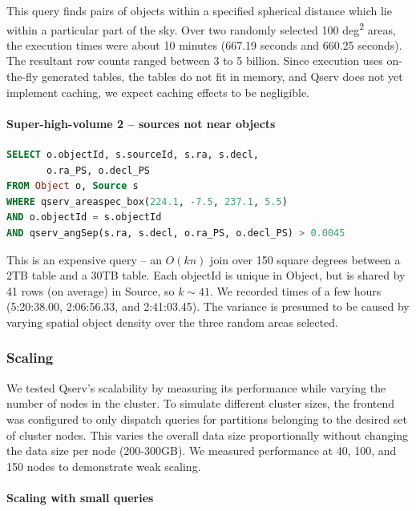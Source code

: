 \documentclass[DM,lsstdraft,toc]{lsstdoc}
\begin{document}
This query finds pairs of objects within a specified spherical distance
which lie within a particular part of the sky. Over two randomly
selected 100 deg\textsuperscript{2} areas, the execution times were
about 10 minutes (667.19 seconds and 660.25 seconds). The resultant row
counts ranged between 3 to 5 billion. Since execution uses on-the-fly
generated tables, the tables do not fit in memory, and Qserv does not
yet implement caching, we expect caching effects to be negligible.

\paragraph{Super-high-volume 2 -- sources not near
objects}\label{super-high-volume-2-sources-not-near-objects}

\begin{lstlisting}[language=SQL]
SELECT o.objectId, s.sourceId, s.ra, s.decl,
       o.ra_PS, o.decl_PS
FROM Object o, Source s
WHERE qserv_areaspec_box(224.1, -7.5, 237.1, 5.5)
AND o.objectId = s.objectId
AND qserv_angSep(s.ra, s.decl, o.ra_PS, o.decl_PS) > 0.0045
\end{lstlisting}

This is an expensive query -- an \(O(kn)\) join over 150 square degrees
between a 2TB table and a 30TB table. Each objectId is unique in Object,
but is shared by 41 rows (on average) in Source, so \(k
\sim 41\). We recorded times of a few hours (5:20:38.00, 2:06:56.33, and
2:41:03.45). The variance is presumed to be caused by varying spatial
object density over the three random areas selected.

\subsubsection{Scaling}\label{scaling}

We tested Qserv's scalability by measuring its performance while varying
the number of nodes in the cluster. To simulate different cluster sizes,
the frontend was configured to only dispatch queries for partitions
belonging to the desired set of cluster nodes. This varies the overall
data size proportionally without changing the data size per node
(200-300GB). We measured performance at 40, 100, and 150 nodes to
demonstrate weak scaling.

\paragraph{Scaling with small queries}\label{scaling-with-small-queries}
\end{document}
